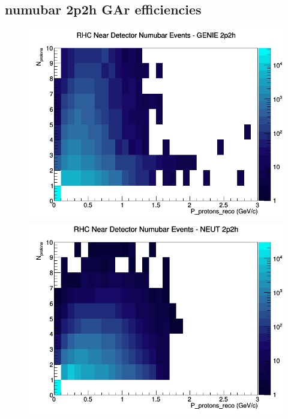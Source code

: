 \documentclass[12pt]{article}
\begin{document}
\subsection{numubar 2p2h GAr efficiencies}
\begin{figure}[h]
\includegraphics[width=\linewidth]{eff_N_P/GAr/protons/2p2h_RHC_ND_numubar_N_P_GENIE.png}
\endminipage
{}
\includegraphics[width=\linewidth]{eff_N_P/GAr/protons/2p2h_RHC_ND_numubar_N_P_NEUT.png}
\endminipage
{}

\end{figure}
\end{document}
